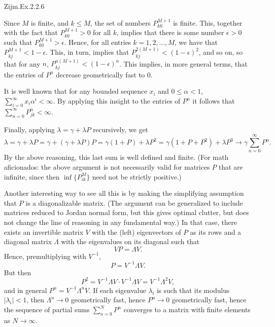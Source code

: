 \begin{exercise}
Zijm.Ex.2.2.6
\begin{solution}
 Since $M$ is finite, and $k\leq M$, the set of numbers $P^{M+1}_{k0}$ is finite.
 This, together with the fact that $P^{M+1}_{k0}>0$ for all $k$, implies that there is some number $\epsilon>0$ such that $P^{M+1}_{k0}>\epsilon$.
 Hence, for all entries $k=1, 2, \ldots, M$, we have that $P^{M+1}_{kj} < 1- \epsilon$.
 This, in turn, implies that $P^{2(M+1)}_{kj} < (1- \epsilon)^2$, and so on, so that for any $n$, $P^{n(M+1)}_{kj} < (1- \epsilon)^n$.
 This implies, in more general terms, that the entries of $P^n$ decrease geometrically fast to $0$.

 It is well known that for any bounded sequence $x_i$ and $0\leq \alpha < 1$, $ \sum_{i=0}^\infty x_i \alpha^i < \infty$.
 By applying this insight to the entries of $P^n$ it follows that $\sum_{n=0}^\infty P^n_{jk} < \infty$.

Finally, applying $\lambda = \gamma + \lambda P$ recursively, we get
\begin{equation*}
 \lambda = \gamma + \lambda P = \gamma + (\gamma + \lambda P)P = \gamma (1+P) + \lambda P^2 = \gamma(1+P+P^2) + \lambda P^3 \to \gamma \sum_{n=0}^\infty P^n.
\end{equation*}
By the above reasoning, this last sum is well defined and finite.
(For math aficionados: the above argument is not necessarily valid for matrices $P$ that are infinite, since then $\inf\{P^{M}_{ik}\}$ need not be strictly positive.)

Another interesting way to see all this is by making the simplifying assumption that $P$ is a diagonalizable matrix.
(The argument can be generalized to include matrices reduced to Jordan normal form, but this gives optimal clutter, but does not change the line of reasoning in any fundamental way.)
In that case, there exists an invertible matrix $V$ with the (left) eigenvectors of $P$ as its rows and a diagonal matrix $\Lambda$ with the eigenvalues on its diagonal such that
\begin{equation*}
 V P = \Lambda V.
\end{equation*}
Hence, premultiplying with $V^{-1}$, 
\begin{equation*}
 P = V^{-1}\Lambda V.
\end{equation*}
But then
\begin{equation*}
P^2 = V^{-1}\Lambda V \cdot V^{-1}\Lambda V= V^{-1}\Lambda^2 V,
\end{equation*}
and in general $P^n = V^{-1}\Lambda^n V$.
If each eigenvalue $\lambda_i$ is such that its modulus $|\lambda_i| < 1$, then $\Lambda^n \to 0$ geometrically fast, hence $P^n\to 0$ geometrically fast, hence the sequence of partial sums $\sum_{n=0}^N P^n$ converges to a matrix with finite elements as $N\to\infty$.


\end{solution}
\end{exercise}
